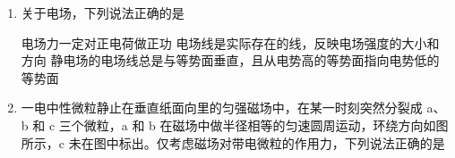 \documentclass[\gkver]{gaokaozhenti}
\begin{document}
\begin{enumerate}
{	C．由物体在地球和火星表面的重力等于各自对物体的引力，则有

	$G\frac{Mm}{R^{2}}=mg$

	得

	$g=\frac{GM}{R^{2}}$

	由于地球和火星的质量关系以及半径关系均未知，则两星球表面重力加速度的关系不可求，C 错误；

	D．地球与火星绕太阳运动的向心加速度由太阳对地球和火星的引力产生，所以向心加速度大小则有

	$G\frac{Mm}{r^{2}}=ma$

	得

	$a=\frac{GM}{r^{2}}$

	由于两星球的轨道半径之比已知，则地球与火星绕太阳运动的向心加速度之比可以求得，D 正确。

	故选 D。
}

\item
关于电场，下列说法正确的是 

{电场力一定对正电荷做正功}
{电场线是实际存在的线，反映电场强度的大小和方向}
{静电场的电场线总是与等势面垂直，且从电势高的等势面指向电势低的等势面}


\item
一电中性微粒静止在垂直纸面向里的匀强磁场中，在某一时刻突然分裂成 a、b 和 c 三个微粒，a 和 b 在磁场中做半径相等的匀速圆周运动，环绕方向如图所示，c 未在图中标出。仅考虑磁场对带电微粒的作用力，下列说法正确的是 



\end{enumerate}
\end{document}
